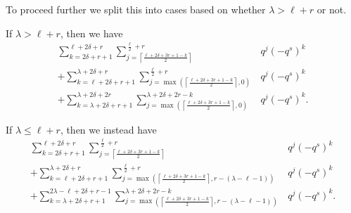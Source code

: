 To proceed further we split this into cases based on whether $\lambda > \ell+r$ or not.
\begin{itemize}
  \ii If $\lambda > \ell + r$, then we have
  \begin{equation}
  \begin{aligned}
    \sum_{k = 2 \delta + r + 1}^{\ell + 2\delta + r}
    \sum_{j = \left\lceil \frac{\ell + 2\delta + 3r + 1 - k}{2} \right\rceil}
      ^{\frac{\ell}{2} + r}
      & q^j (-q^s)^k \\
    + \sum_{k = \ell + 2 \delta + r + 1}^{\lambda + 2 \delta + r}
    \sum_{j=\max\left( \left\lceil \frac{\ell + 2\delta + 3r + 1 - k}{2} \right\rceil, 0\right)}
      ^{\frac{\ell}{2} + r}
      & q^j (-q^s)^k \\
    + \sum_{k = \lambda + 2\delta + r + 1}^{\lambda + 2 \delta + 2r}
    \sum_{j=\max\left( \left\lceil \frac{\ell + 2\delta + 3r + 1 - k}{2} \right\rceil, 0 \right)}
      ^{\lambda+2\delta+2r-k}
      & q^j (-q^s)^k.
  \end{aligned}
  \label{eq:ell_even_missing1}
  \end{equation}

  \ii If $\lambda \le \ell + r$, then we instead have
  \begin{equation}
  \begin{aligned}
    \sum_{k = 2 \delta + r + 1}^{\ell + 2\delta + r}
    \sum_{j = \left\lceil \frac{\ell + 2\delta + 3r + 1 - k}{2} \right\rceil}
      ^{\frac{\ell}{2} + r}
      & q^j (-q^s)^k \\
    + \sum_{k = \ell + 2 \delta + r + 1}^{\lambda + 2 \delta + r}
    \sum_{j=\max\left( \left\lceil \frac{\ell + 2\delta + 3r + 1 - k}{2} \right\rceil,
      r-(\lambda-\ell-1)\right)}
      ^{\frac{\ell}{2} + r}
      & q^j (-q^s)^k \\
    + \sum_{k = \lambda + 2\delta + r + 1}^{2\lambda - \ell + 2\delta + r - 1}
    \sum_{j=\max\left( \left\lceil \frac{\ell + 2\delta + 3r + 1 - k}{2} \right\rceil,
      r-(\lambda-\ell-1)\right)}^{\lambda+2\delta+2r-k}
      & q^j (-q^s)^k.
  \end{aligned}
  \label{eq:ell_even_missing2}
  \end{equation}
\end{itemize}

